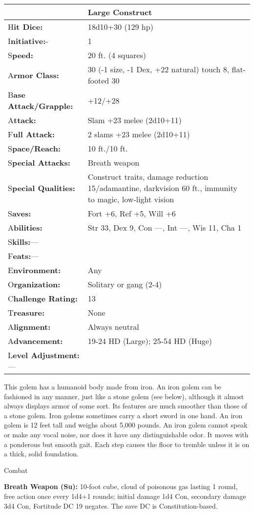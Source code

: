 \documentclass{article}
\begin{document}
\begin{tabular}{|>{\raggedright}p{91pt}|>{\raggedright}p{223pt}|}
\hline
  & Large Construct\tabularnewline
\hline
H\textbf{it Dice:} & 18d10+30 (129 hp)\tabularnewline
\hline
I\textbf{nitiative:}- & 1\tabularnewline
\hline
S\textbf{peed:} & 20 ft. (4 squares)\tabularnewline
\hline
A\textbf{rmor Class:} & 30 (-1 size, -1 Dex, +22 natural) touch 8, flat-footed 
30\tabularnewline
\hline
B\textbf{ase Attack/Grapple:} & +12/+28\tabularnewline
\hline
A\textbf{ttack:} & Slam +23 melee (2d10+11)\tabularnewline
\hline
F\textbf{ull Attack:} & 2 slams +23 melee (2d10+11)\tabularnewline
\hline
S\textbf{pace/Reach:} & 10 ft./10 ft.\tabularnewline
\hline
S\textbf{pecial Attacks:} & Breath weapon\tabularnewline
\hline
S\textbf{pecial Qualities:} & Construct traits, damage reduction 15/adamantine, 
darkvision 60 ft., immunity to magic, low-light vision\tabularnewline
\hline
S\textbf{aves:} & Fort +6, Ref +5, Will +6\tabularnewline
\hline
A\textbf{bilities:} & Str 33, Dex 9, Con ---, Int ---, Wis 11, Cha 1\tabularnewline
\hline
S\textbf{kills:}--- & \tabularnewline
\hline
F\textbf{eats:}--- & \tabularnewline
\hline
E\textbf{nvironment:} & Any\tabularnewline
\hline
O\textbf{rganization:} & Solitary or gang (2-4)\tabularnewline
\hline
C\textbf{hallenge Rating:} & 13\tabularnewline
\hline
T\textbf{reasure:} & None\tabularnewline
\hline
A\textbf{lignment:} & Always neutral\tabularnewline
\hline
A\textbf{dvancement:} & 19-24 HD (Large); 25-54 HD (Huge)\tabularnewline
\hline
L\textbf{evel Adjustment:}--- & \tabularnewline
\hline
\end{tabular}

This golem has a humanoid body made from iron. An iron golem can be fashioned in 
any manner, just like a stone golem (see below), although it almost always displays 
armor of some sort. Its features are much smoother than those of a stone golem. 
Iron golems sometimes carry a short sword in one hand. An iron golem is 12 feet 
tall and weighs about 5,000 pounds. An iron golem cannot speak or make any vocal 
noise, nor does it have any distinguishable odor. It moves with a ponderous but 
smooth gait. Each step causes the floor to tremble unless it is on a thick, solid 
foundation.

Combat

\textbf{Breath Weapon (Su):} 10-foot cube, cloud of poisonous gas lasting 1 round, 
free action once every 1d4+1 rounds; initial damage 1d4 Con, secondary damage 3d4 
Con, Fortitude DC 19 negates. The save DC is Constitution-based. 
\end{document}
